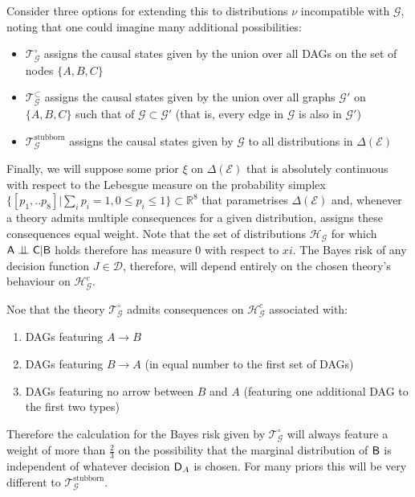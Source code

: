 \begin{example}
Consider three options for extending this to distributions $\nu$ incompatible with $\mathcal{G}$, noting that one could imagine many additional possibilities:
\begin{itemize}
    \item $\mathscr{T}_{\mathcal{G}}^\circ$ assigns the causal states given by the union over all DAGs on the set of nodes $\{A, B, C\}$
    \item $\mathscr{T}_{\mathcal{G}}^\subset$ assigns the causal states given by the union over all graphs $\mathcal{G}'$ on $\{A, B, C\}$ such that of $\mathcal{G}\subset \mathcal{G}'$ (that is, every edge in $\mathcal{G}$ is also in $\mathcal{G}'$)
    \item $\mathscr{T}_{\mathcal{G}}^\mathrm{stubborn}$ assigns the causal states given by $\mathcal{G}$ to all distributions in $\Delta(\mathcal{E})$
\end{itemize}

Finally, we will suppose some prior $\xi$ on $\Delta(\mathcal{E})$ that is absolutely continuous with respect to the Lebesgue measure on the probability simplex $\{[p_1,..p_8]|\sum_i p_i=1,0\leq p_i \leq 1\}\subset\mathbb{R}^8$ that parametrises $\Delta(\mathcal{E})$ and, whenever a theory admits multiple consequences for a given distribution, assigns these consequences equal weight. Note that the set of distributions $\mathscr{H}_{\mathcal{G}}$ for which $\RV{A}\CI \RV{C} | \RV{B}$ holds therefore has measure 0 with respect to $xi$\cite{meek_strong_1995}. The Bayes risk of any decision function $J\in \mathscr{D}$, therefore, will depend entirely on the chosen theory's behaviour on $\mathscr{H}_{\mathcal{G}}^c$.

Noe that the theory $\mathscr{T}_{\mathcal{G}}^\circ$ admits consequences on $\mathscr{H}_{\mathcal{G}}^c$ associated with:
\begin{enumerate}
    \item DAGs featuring $A\to B$
    \item DAGs featuring $B\to A$ (in equal number to the first set of DAGs)
    \item DAGs featuring no arrow between $B$ and $A$ (featuring one additional DAG to the first two types)
\end{enumerate} 
Therefore the calculation for the Bayes risk given by $\mathscr{T}_{\mathcal{G}}^\circ$ will always feature a weight of more than $\tfrac{2}{3}$ on the possibility that the marginal distribution of $\mathsf{B}$ is independent of whatever decision $\mathsf{D}_A$ is chosen. For many priors this will be very different to $\mathscr{T}_{\mathcal{G}}^\mathrm{stubborn}$.


\end{example}
